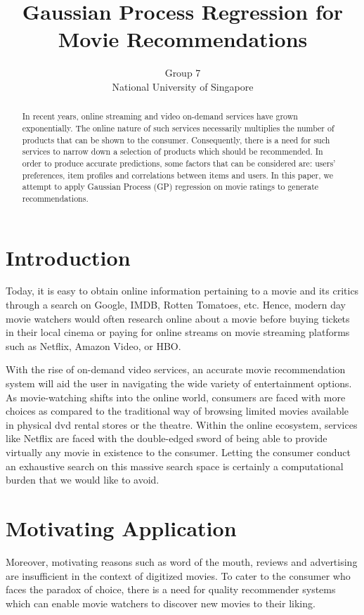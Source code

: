 \documentclass[letterpaper]{article}
\begin{document}
%
\title{Gaussian Process Regression for Movie Recommendations}
\author{Group 7\\
National University of Singapore
}
\maketitle
\begin{abstract}
In recent years, online streaming and video on-demand services have grown exponentially. The online nature of such services necessarily multiplies the number of products that can be shown to the consumer. Consequently, there is a need for such services to narrow down a selection of products which should be recommended. In order to produce accurate predictions, some factors that can be considered are: users' preferences, item profiles and correlations between items and users. In this paper, we attempt to apply Gaussian Process (GP) regression on movie ratings to generate recommendations.
\end{abstract}

\section{Introduction}
\noindent Today, it is easy to obtain online information pertaining to a movie and its critics through a search on Google, IMDB, Rotten Tomatoes, etc. Hence, modern day movie watchers would often research online about a movie before buying tickets in their local cinema or paying for online streams on movie streaming platforms such as Netflix, Amazon Video, or HBO.

With the rise of on-demand video services, an accurate movie recommendation system will aid the user in navigating the wide variety of entertainment options. As movie-watching shifts into the online world, consumers are faced with more choices as compared to the traditional way of browsing limited movies available in physical dvd rental stores or the theatre. Within the online ecosystem, services like Netflix are faced with the double-edged sword of being able to provide virtually any movie in existence to the consumer. Letting the consumer conduct an exhaustive search on this massive search space is certainly a computational burden that we would like to avoid.

\section{Motivating Application}
Moreover, motivating reasons such as word of the mouth, reviews and advertising are insufficient in the context of digitized movies. To cater to the consumer who faces the paradox of choice, there is a need for quality recommender systems which can enable movie watchers to discover new movies to their liking.
\end{document}
